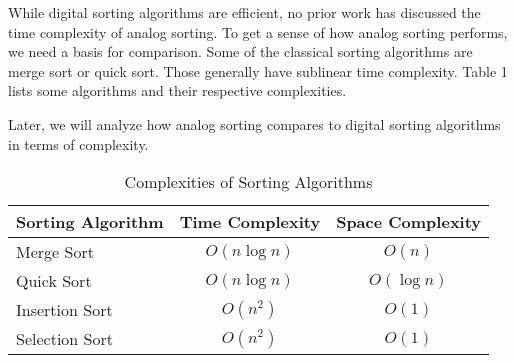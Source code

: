 While digital sorting algorithms are efficient, no prior work has discussed the time complexity of analog sorting. To get a sense of how analog sorting performs, we need a basis for comparison. Some of the classical sorting algorithms are merge sort or quick sort. Those generally have sublinear time complexity. Table 1 lists some algorithms and their respective complexities.

Later, we will analyze how analog sorting compares to digital sorting algorithms in terms of complexity. 

\begin{table}[h]
\centering
\caption{Complexities of Sorting Algorithms}
\begin{tabular}{|l|c|c|} \hline
Sorting Algorithm&Time Complexity&Space Complexity\\ \hline
Merge Sort & $O(n\log n)$& $O(n)$\\ \hline
Quick Sort & $O(n\log n)$& $O(\log n)$\\ \hline
Insertion Sort & $O(n^2)$& $O(1)$\\ \hline
Selection Sort & $O(n^2)$& $O(1)$\\
\hline\end{tabular}
\end{table}



